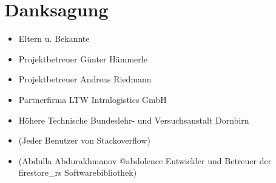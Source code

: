 \section{Danksagung}

\begin{itemize}
  \item Eltern u. Bekannte
  \item Projektbetreuer Günter Hämmerle
  \item Projektbetreuer Andreas Riedmann
  \item Partnerfirma LTW Intralogistics GmbH
  \item Höhere Technische Bundeslehr- und Versuchsanstalt Dornbirn
  \item (Jeder Benutzer von Stackoverflow)
  \item (Abdulla Abdurakhmanov @abdolence Entwickler und Betreuer der firestore\_rs Softwarebibliothek)
\end{itemize}